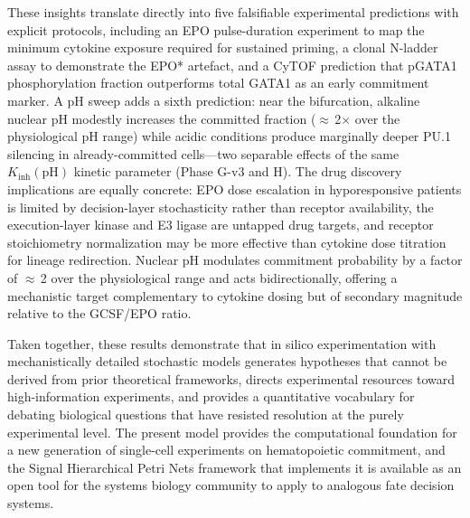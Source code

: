 These insights translate directly into five falsifiable experimental predictions with explicit protocols, including an EPO pulse-duration experiment to map the minimum cytokine exposure required for sustained priming, a clonal N-ladder assay to demonstrate the EPO* artefact, and a CyTOF prediction that pGATA1 phosphorylation fraction outperforms total GATA1 as an early commitment marker. A pH sweep adds a sixth prediction: near the bifurcation, alkaline nuclear pH modestly increases the committed fraction ($\approx$\,2$\times$ over the physiological pH range) while acidic conditions produce marginally deeper PU.1 silencing in already-committed cells---two separable effects of the same $K_{\mathrm{inh}}(\mathrm{pH})$ kinetic parameter (Phase G-v3 and H). The drug discovery implications are equally concrete: EPO dose escalation in hyporesponsive patients is limited by decision-layer stochasticity rather than receptor availability, the execution-layer kinase and E3 ligase are untapped drug targets, and receptor stoichiometry normalization may be more effective than cytokine dose titration for lineage redirection. Nuclear pH modulates commitment probability by a factor of $\approx$\,2 over the physiological range and acts bidirectionally, offering a mechanistic target complementary to cytokine dosing but of secondary magnitude relative to the GCSF/EPO ratio.

Taken together, these results demonstrate that in silico experimentation with mechanistically detailed stochastic models generates hypotheses that cannot be derived from prior theoretical frameworks, directs experimental resources toward high-information experiments, and provides a quantitative vocabulary for debating biological questions that have resisted resolution at the purely experimental level. The present model provides the computational foundation for a new generation of single-cell experiments on hematopoietic commitment, and the Signal Hierarchical Petri Nets framework that implements it is available as an open tool for the systems biology community to apply to analogous fate decision systems.
